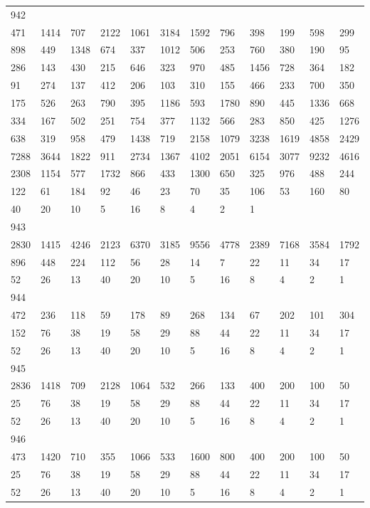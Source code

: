 \begin{longtable}{llllllllllll}
942&&&&&&&&&&&\\
471& 1414& 707& 2122& 1061& 3184& 1592& 796& 398& 199& 598& 299\\
898& 449& 1348& 674& 337& 1012& 506& 253& 760& 380& 190& 95\\
286& 143& 430& 215& 646& 323& 970& 485& 1456& 728& 364& 182\\
91& 274& 137& 412& 206& 103& 310& 155& 466& 233& 700& 350\\
175& 526& 263& 790& 395& 1186& 593& 1780& 890& 445& 1336& 668\\
334& 167& 502& 251& 754& 377& 1132& 566& 283& 850& 425& 1276\\
638& 319& 958& 479& 1438& 719& 2158& 1079& 3238& 1619& 4858& 2429\\
7288& 3644& 1822& 911& 2734& 1367& 4102& 2051& 6154& 3077& 9232& 4616\\
2308& 1154& 577& 1732& 866& 433& 1300& 650& 325& 976& 488& 244\\
122& 61& 184& 92& 46& 23& 70& 35& 106& 53& 160& 80\\
40& 20& 10& 5& 16& 8& 4& 2& 1& \\

943&&&&&&&&&&&\\
2830& 1415& 4246& 2123& 6370& 3185& 9556& 4778& 2389& 7168& 3584& 1792\\
896& 448& 224& 112& 56& 28& 14& 7& 22& 11& 34& 17\\
52& 26& 13& 40& 20& 10& 5& 16& 8& 4& 2& 1\\

944&&&&&&&&&&&\\
472& 236& 118& 59& 178& 89& 268& 134& 67& 202& 101& 304\\
152& 76& 38& 19& 58& 29& 88& 44& 22& 11& 34& 17\\
52& 26& 13& 40& 20& 10& 5& 16& 8& 4& 2& 1\\

945&&&&&&&&&&&\\
2836& 1418& 709& 2128& 1064& 532& 266& 133& 400& 200& 100& 50\\
25& 76& 38& 19& 58& 29& 88& 44& 22& 11& 34& 17\\
52& 26& 13& 40& 20& 10& 5& 16& 8& 4& 2& 1\\

946&&&&&&&&&&&\\
473& 1420& 710& 355& 1066& 533& 1600& 800& 400& 200& 100& 50\\
25& 76& 38& 19& 58& 29& 88& 44& 22& 11& 34& 17\\
52& 26& 13& 40& 20& 10& 5& 16& 8& 4& 2& 1\\


\end{longtable}

